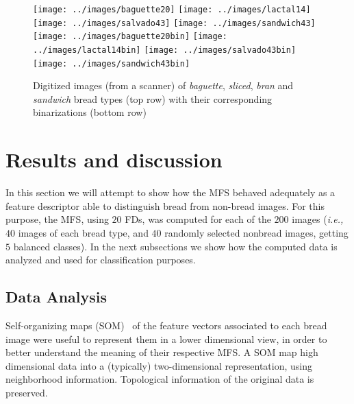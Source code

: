 
\begin{figure}[htb]
\centering
\texttt{[image: ../images/baguette20]}
\texttt{[image: ../images/lactal14]}
\texttt{[image: ../images/salvado43]}
\texttt{[image: ../images/sandwich43]}
\texttt{[image: ../images/baguette20bin]}
\texttt{[image: ../images/lactal14bin]}
\texttt{[image: ../images/salvado43bin]}
\texttt{[image: ../images/sandwich43bin]}
\caption{Digitized images (from a scanner) of {\em baguette}, {\em sliced}, {\em bran} and {\em sandwich} bread types (top row) with their corresponding binarizations (bottom row)}
\label{fig:bread}
\end{figure}


\section{Results and discussion}
\label{sec:9}

In this section we will attempt to show how the MFS behaved adequately as a feature descriptor able to distinguish bread from non-bread images. For this purpose, the MFS, using $20$ FDs, was computed for each of the $200$ images ({\em i.e.,} $40$ images of each bread type, and $40$ randomly selected nonbread images, getting $5$ balanced classes). In the next subsections we show how the computed data is analyzed and used for classification purposes.


\subsection{Data Analysis}
\label{sec:11}

Self-organizing maps (SOM)~\cite{Kohonen2001} of the feature vectors associated to each bread image were useful to represent them in a lower dimensional view, in order to better understand the meaning of their respective MFS. A SOM map high dimensional data into a (typically) two-dimensional representation, using neighborhood information. Topological information of the original data is preserved.


